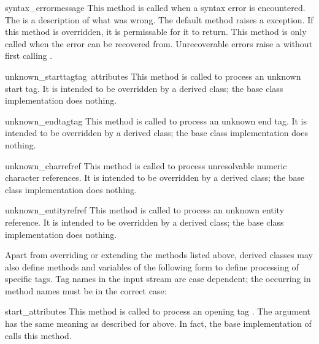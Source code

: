 \begin{funcdesc}{syntax_error}{message}
This method is called when a syntax error is encountered.  The
 is a description of what was wrong.  The default method 
raises a  exception.  If this method is overridden, 
it is permissable for it to return.  This method is only called when
the error can be recovered from.  Unrecoverable errors raise a
 without first calling .
\end{funcdesc}

\begin{funcdesc}{unknown_starttag}{tag\, attributes}
This method is called to process an unknown start tag.  It is intended
to be overridden by a derived class; the base class implementation
does nothing.
\end{funcdesc}

\begin{funcdesc}{unknown_endtag}{tag}
This method is called to process an unknown end tag.  It is intended
to be overridden by a derived class; the base class implementation
does nothing.
\end{funcdesc}

\begin{funcdesc}{unknown_charref}{ref}
This method is called to process unresolvable numeric character
references.  It is intended to be overridden by a derived class; the
base class implementation does nothing.
\end{funcdesc}

\begin{funcdesc}{unknown_entityref}{ref}
This method is called to process an unknown entity reference.  It is
intended to be overridden by a derived class; the base class
implementation does nothing.
\end{funcdesc}

Apart from overriding or extending the methods listed above, derived
classes may also define methods and variables of the following form to
define processing of specific tags.  Tag names in the input stream are
case dependent; the  occurring in method names must be in the
correct case:

\begin{funcdesc}{start_}{attributes}
This method is called to process an opening tag .  The
 argument has the same meaning as described for
 above.  In fact, the base implementation of
 calls this method.
\end{funcdesc}

